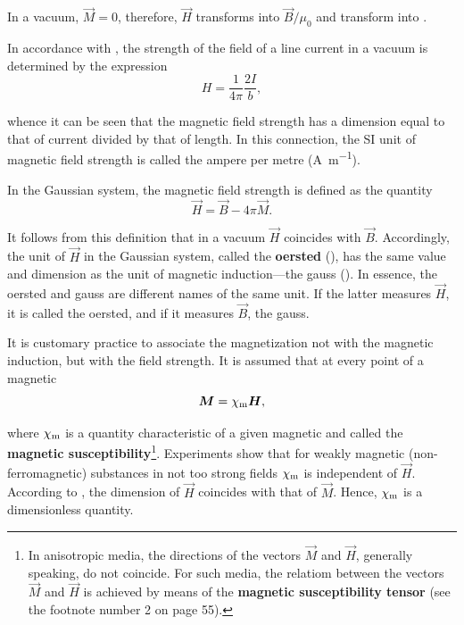In a vacuum, $\vec{M}=0$, therefore, $\vec{H}$ transforms into $\vec{B}/\mu_0$ and  transform into .

In accordance with , the strength of the field of a line current in a vacuum is determined by the expression
\begin{equation}\label{eq:7_12}
    H = \frac{1}{4\pi}\frac{2I}{b},
\end{equation}

\noindent
whence it can be seen that the magnetic field strength has a dimension equal to that of current divided by that of length.
In this connection, the SI unit of magnetic field strength is called the ampere per metre (\si{\ampere\per\metre}).

In the Gaussian system, the magnetic field strength is defined as the quantity
\begin{equation}\label{eq:7_13}
    \vec{H} = \vec{B} - 4\pi \vec{M}.
\end{equation}

\noindent
It follows from this definition that in a vacuum $\vec{H}$ coincides with $\vec{B}$.
Accordingly, the unit of $\vec{H}$ in the Gaussian system, called the \textbf{oersted} (\si{\oersted}), has the same value and dimension as the unit of magnetic induction---the gauss (\si{\gauss}).
In essence, the oersted and gauss are different names of the same unit.
If the latter measures $\vec{H}$, it is called the oersted, and if it measures $\vec{B}$, the gauss.

It is customary practice to associate the magnetization not with the magnetic induction, but with the field strength.
It is assumed that at every point of a magnetic
\vspace{-12pt}
\begin{equation}\label{eq:7_14}
    \boldsymbol{M} = \chi_{\text{m}} \boldsymbol{H},
\end{equation}

\noindent
where $\chi_{\text{m}}$ is a quantity characteristic of a given magnetic and called the \textbf{magnetic susceptibility}\footnote{In anisotropic media, the directions of the vectors $\vec{M}$ and $\vec{H}$, generally speaking, do not coincide. For such media, the relatiom between the vectors $\vec{M}$ and $\vec{H}$ is achieved by means of the \textbf{magnetic susceptibility tensor} (see the footnote number 2 on page 55).}.
Experiments show that for weakly magnetic (non-ferromagnetic) substances in not too strong fields
$\chi_{\text{m}}$ is independent of $\vec{H}$.
According to , the dimension of $\vec{H}$ coincides with that of $\vec{M}$.
Hence, $\chi_{\text{m}}$ is a dimensionless quantity.

